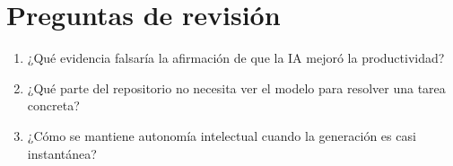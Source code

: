 \section{Preguntas de revisión}
\begin{enumerate}
  \item ¿Qué evidencia falsaría la afirmación de que la IA mejoró la productividad?
  \item ¿Qué parte del repositorio no necesita ver el modelo para resolver una tarea concreta?
  \item ¿Cómo se mantiene autonomía intelectual cuando la generación es casi instantánea?
\end{enumerate}
